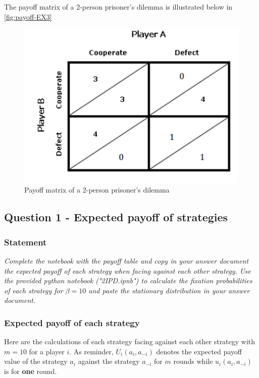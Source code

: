 \documentclass{article}
\begin{document}
The payoff matrix of a 2-person prisoner's dilemma is illustrated below in \autoref{fig:payoff-EX3} 

\begin{figure}[h]
  \centering
  \includegraphics[scale=0.5]{figures/payoff-EX3.png}
  \caption{Payoff matrix of a 2-person prisoner's dilemma}
  \label{fig:payoff-EX3}
\end{figure}

\subsection{Question 1 - Expected payoff of strategies}

\subsubsection*{Statement}

\textit{Complete the notebook with the payoff table and copy in your answer	document the expected payoff of each strategy when facing	against	each other strategy. Use the provided python notebook ("2IPD.ipnb") to calculate the fixation probabilities of each strategy for $\beta = 10$ and paste the stationary distribution in your answer document.}

\subsubsection{Expected payoff of each strategy}
Here are the calculations of each strategy facing against each other strategy with $m = 10$ for a player $i$. As reminder, $U_{i}(a_{i},a_{-i})$ denotes the expected payoff value of the strategy $a_{i}$ against the strategy $a_{-i}$ for $m$ rounds while $u_{i}(a_{i},a_{-i})$ is for \textbf{one} round.  
\end{document}
